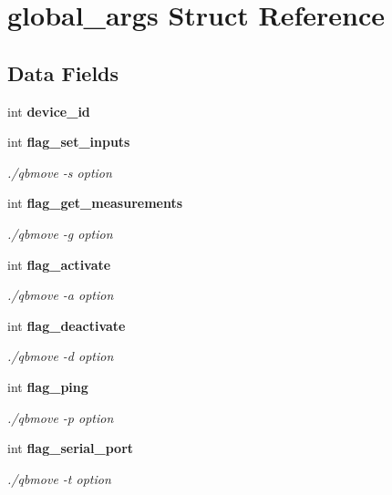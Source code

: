 \section{global\+\_\+args Struct Reference}
\label{structglobal__args}
\subsection*{Data Fields}
\begin{DoxyCompactItemize}
\item 
\mbox{\label{structglobal__args_accfd0301c469314772cc651ec198d492}} 
int {\bfseries device\+\_\+id}
\item 
\mbox{\label{structglobal__args_a8c2bd6bbe7e544186ac9dafe368eda0a}} 
int \textbf{ flag\+\_\+set\+\_\+inputs}
\begin{DoxyCompactList}\small\item\em ./qbmove -\/s option \end{DoxyCompactList}\item 
\mbox{\label{structglobal__args_ae6be84e61dfa72e2992e18b2ff872d37}} 
int \textbf{ flag\+\_\+get\+\_\+measurements}
\begin{DoxyCompactList}\small\item\em ./qbmove -\/g option \end{DoxyCompactList}\item 
\mbox{\label{structglobal__args_a357acdae444e13e67d3747246a2a6537}} 
int \textbf{ flag\+\_\+activate}
\begin{DoxyCompactList}\small\item\em ./qbmove -\/a option \end{DoxyCompactList}\item 
\mbox{\label{structglobal__args_a3f8a32491b8271e7dcf9645888fd5d90}} 
int \textbf{ flag\+\_\+deactivate}
\begin{DoxyCompactList}\small\item\em ./qbmove -\/d option \end{DoxyCompactList}\item 
\mbox{\label{structglobal__args_a666e67d4cbdc4b0c0ceaebc7f0d7e4ae}} 
int \textbf{ flag\+\_\+ping}
\begin{DoxyCompactList}\small\item\em ./qbmove -\/p option \end{DoxyCompactList}\item 
\mbox{\label{structglobal__args_a5d91f73cfac19063f3b690444214cb11}} 
int \textbf{ flag\+\_\+serial\+\_\+port}
\begin{DoxyCompactList}\small\item\em ./qbmove -\/t option \end{DoxyCompactList}\item 

\end{DoxyCompactItemize}
